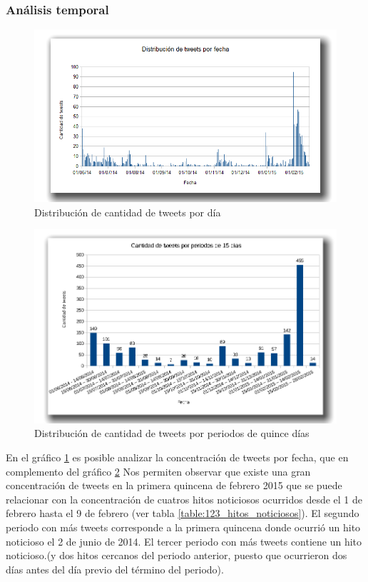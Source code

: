 \subsubsection{Análisis temporal}

\begin{figure}[H]
	\centering
	\includegraphics[width=1\textwidth]{imgs/123_general.png}
	\caption{Distribución de cantidad de tweets por día}
	\label{fig:123_tweets_por_dia}
\end{figure}

\begin{figure}[H]
	\centering
	\includegraphics[width=1\textwidth]{imgs/cantidad_tweets_por_quincena_123_2.png}
	\caption{Distribución de cantidad de tweets por periodos de quince días}
	\label{fig:cantidad_tweets_por_quincena_123}
\end{figure}

En el gráfico \ref{fig:123_tweets_por_dia} es posible analizar la concentración de tweets por fecha, que en complemento del gráfico \ref{fig:cantidad_tweets_por_quincena_123} Nos permiten observar que existe una gran concentración de tweets en la primera quincena de febrero 2015 que se puede relacionar con la concentración de cuatros hitos noticiosos ocurridos desde el 1 de febrero hasta el 9 de febrero (ver tabla \ref{table:123_hitos_noticiosos}). El segundo periodo con más tweets corresponde a la primera quincena donde ocurrió un hito noticioso el 2 de junio de 2014. El tercer periodo con más tweets contiene un hito noticioso.(y dos hitos cercanos del periodo anterior, puesto que ocurrieron dos días antes del día previo del término del periodo). 

